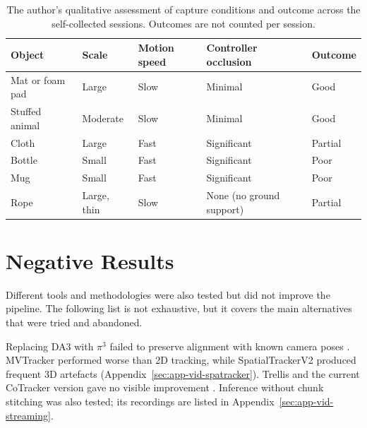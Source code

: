 \begin{table}[H]
	\caption{The author's qualitative assessment of capture conditions and outcome across the self-collected sessions. Outcomes are not counted per session.}
	\label{tab:eval-objects}
	\begin{center}
		\begin{tabular}{@{}>{\raggedright\arraybackslash}p{2.6cm}
		                  >{\raggedright\arraybackslash}p{2.2cm}
		                  >{\raggedright\arraybackslash}p{2.3cm}
		                  >{\raggedright\arraybackslash}p{3.0cm}
		                  >{\raggedright\arraybackslash}p{2.5cm}@{}}
			\toprule
			Object & Scale & Motion speed & Controller occlusion & Outcome \\
			\midrule
			Mat or foam pad & Large & Slow & Minimal & Good \\
			Stuffed animal & Moderate & Slow & Minimal & Good \\
			Cloth & Large & Fast & Significant & Partial \\
			Bottle & Small & Fast & Significant & Poor \\
			Mug & Small & Fast & Significant & Poor \\
			Rope & Large, thin & Slow & None (no ground support) & Partial \\
			\bottomrule
		\end{tabular}
	\end{center}
\end{table}


\section{Negative Results}
\label{sec:eval-negative}

Different tools and methodologies were also tested but did not improve the pipeline. The following list is not exhaustive, but it covers the main alternatives that were tried and abandoned.

Replacing DA3 with $\pi^3$ failed to preserve alignment with known camera poses \parencite{pi3}.
MVTracker performed worse than 2D tracking, while SpatialTrackerV2 produced frequent 3D artefacts
\parencite{mvtracker, spatrackerv2} (Appendix~\ref{sec:app-vid-spatracker}). Trellis and the current CoTracker version gave no
visible improvement \parencite{trellis, cotracker}. Inference without chunk stitching was also tested; its recordings are listed in
Appendix~\ref{sec:app-vid-streaming}.
